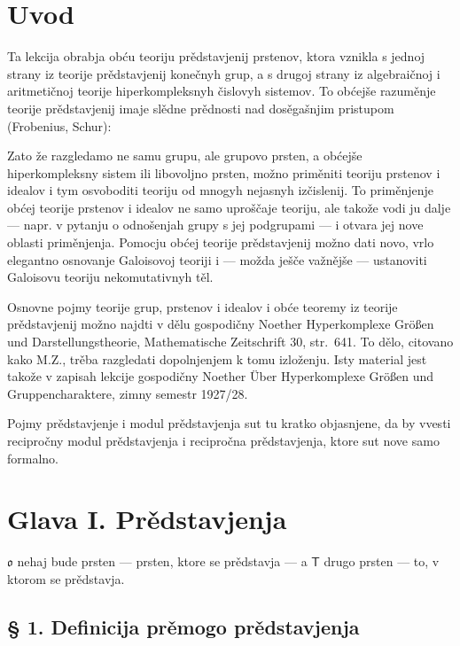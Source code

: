 \documentclass[11pt]{article}
\newcommand{\foreign}[1]{#1}
\begin{document}
\clearpage
\section*{Uvod}\label{einleitung}

Ta lekcija obrabja obću teoriju prědstavjenij prstenov, ktora vznikla s
jednoj strany iz teorije prědstavjenij konečnyh grup, a s drugoj strany
iz algebraičnoj i aritmetičnoj teorije hiperkompleksnyh čislovyh
sistemov. To obćejše razuměnje teorije prědstavjenij imaje slědne
prědnosti nad dosěgašnjim pristupom (\foreign{Frobenius},
\foreign{Schur}):

Zato že razgledamo ne samu grupu, ale grupovo prsten, a obćejše
hiperkompleksny sistem ili libovoljno prsten, možno priměniti
teoriju prstenov i idealov i tym osvoboditi teoriju od mnogyh nejasnyh
izčislenij. To priměnjenje obćej teorije prstenov i idealov ne samo
uproščaje teoriju, ale takože vodi ju dalje --- napr. v pytanju o
odnošenjah grupy s jej podgrupami --- i otvara jej nove oblasti
priměnjenja. Pomocju obćej teorije prědstavjenij možno dati novo, vrlo
elegantno osnovanje Galoisovoj teoriji i --- možda ješče važnějše ---
ustanoviti Galoisovu teoriju nekomutativnyh těl.

Osnovne pojmy teorije grup, prstenov i idealov i obće teoremy iz teorije
prědstavjenij možno najdti v dělu gospodičny \foreign{Noether}
\foreign{Hyperkomplexe Größen und Darstellungstheorie},
\foreign{Mathematische Zeitschrift} 30, str.~641. To dělo, citovano
kako \foreign{M.Z.}, trěba razgledati dopolnjenjem k tomu izloženju.
Isty material jest takože v zapisah lekcije gospodičny
\foreign{Noether} \foreign{Über Hyperkomplexe Größen und
Gruppencharaktere}, zimny semestr 1927/28.

Pojmy prědstavjenje i modul prědstavjenja sut tu kratko objasnjene,
da by vvesti recipročny modul prědstavjenja i recipročna
prědstavjenja, ktore sut nove samo formalno.

\section*{Glava I. Prědstavjenja}\label{kapitel-i.-darstellungen}

$\mathfrak{o}$ nehaj bude prsten --- prsten, ktore se prědstavja --- a
$\mathsf T$ drugo prsten --- to, v ktorom se prědstavja.

\subsection*{§ 1. Definicija prěmogo prědstavjenja}\label{definition-der-direkten-darstellung}
\end{document}

